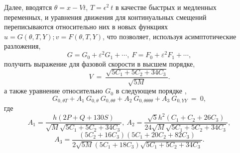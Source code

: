 Далее, вводятся $\theta = x- V t$, $T= \epsilon ^2~t$ в качестве быстрых и медленных переменных, и уравнения движения для континуальных смещений переписываются относительно них в новых функциях $u= G\left(\theta, T ,Y\right); v= F\left(\theta, T, Y\right)$, что позволяет, используя асимптотические разложения,
\[
G = G_0 + \varepsilon^2 G_1+\cdots,~F = F_0+\varepsilon^2 F_1+\cdots,
\]
получить выражение для фазовой скорости в высшем порядке,
\begin{equation}
	V~=~ \frac{\sqrt{5 C_1 + 5 C_2 + 34 C_3}}{\sqrt{5M}}. \label{solvel}
\end{equation}
а также уравнение относительно $G_0$ в следующем порядке \cite{PorOsAnt2020},
\begin{equation}
	G_{0,\theta T}+ A_1~ G_{0,\theta}~ G_{0,\theta \theta} +A_2 ~G_{0,\theta \theta \theta \theta}+ A_3~ G_{0,Y Y}~=~0, \label{nonkp}
\end{equation}
где
\[
A_1=\frac{h \left(2 P+ Q + 130 S\right)}{ \sqrt{M} \sqrt{5 C_1 + 5 C_2 + 34 C_3}}, ~A_2 = \frac{\sqrt{5} h^2 (C_1 + C_2+26 C_3)}{24 \sqrt{M} \sqrt{5 C_1+5 C_2 + 34 C_3}},
\]
\[
A_3 = \frac{(5 C_2 + 16 C_3) (5 C_1 + 20 C_2+ 82 C_3)}{2  \sqrt{5M} (5 C_1+18 C_3 ) \sqrt{5 C_1 + 5 C_2 + 34 C_3}}.
\]

